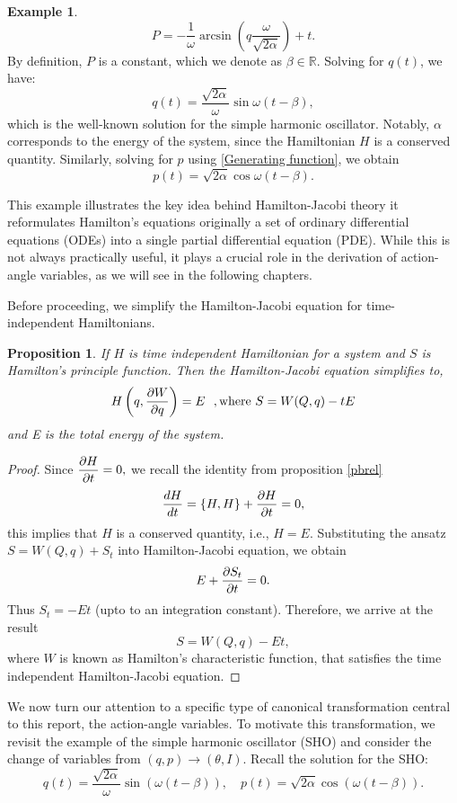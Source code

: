 \documentclass[12pt,oneside]{report}
\newtheorem{Proposition}[theorem]{Proposition}
\theoremstyle{definition}
\newtheorem{example}{Example}
\begin{document}
\begin{example}
\begin{equation}
P = -\frac{1}{\omega} \arcsin \left( q \frac{\omega}{\sqrt{2\alpha}} \right) + t.
\end{equation}
By definition, $P$ is a constant, which we denote as $\beta \in \mathbb{R}$. Solving for $q(t)$, we have:
\begin{equation}
q(t) = \frac{\sqrt{2\alpha}}{\omega} \sin \omega (t - \beta),
\end{equation}
which is the well-known solution for the simple harmonic oscillator. Notably, $\alpha$ corresponds to the energy of the system, since the Hamiltonian $H$ is a conserved quantity. Similarly, solving for $p$ using \autoref{Generating function}, we obtain
\begin{equation}
p(t) = \sqrt{2\alpha} \cos \omega (t - \beta).
\end{equation}
\end{example}
This example illustrates the key idea behind Hamilton-Jacobi theory it reformulates Hamilton’s equations originally a set of ordinary differential equations (ODEs) into a single partial differential equation (PDE). While this is not always practically useful, it plays a crucial role in the derivation of action-angle variables, as we will see in the following chapters.

Before proceeding, we simplify the Hamilton-Jacobi equation for time-independent Hamiltonians.
\begin{Proposition}\label{Time independent HJ}
    If $H$ is time independent Hamiltonian for a system and $S$ is Hamilton's principle function. Then the Hamilton-Jacobi equation simplifies to,
    $$H\left( q,\displaystyle\frac{\partial W}{\partial q}\right) = E \ \ ,\text{where} \ S = W(Q,q) -tE$$
    and E is the total energy of the system.
\end{Proposition}
\begin{proof}
    Since $\displaystyle\frac{\partial H}{\partial t} = 0 ,$ we recall the identity from proposition \ref{pbrel}
    $$ \displaystyle\frac{d H}{d t} = \displaystyle \left\{ H , H \right\} + \displaystyle\frac{\partial H}{\partial t } = 0,$$
    this implies that $H$ is a conserved quantity, i.e., $H = E$. Substituting the ansatz $S = W(Q,q)+S_{t}$ into Hamilton-Jacobi equation, we obtain
    $$ E+\displaystyle\frac{\partial S_{t}}{\partial t} = 0.$$
    Thus $S_{t} = -Et$  (upto to an integration constant). Therefore, we arrive at the result
    $$S = W(Q,q)-Et,$$
   where $W$ is known as Hamilton's characteristic function, that satisfies the time independent Hamilton-Jacobi equation.
\end{proof}

We now turn our attention to a specific type of canonical transformation central to this report, the action-angle variables. To motivate this transformation, we revisit the example of the simple harmonic oscillator (SHO) and consider the change of variables from $(q, p) \to (\theta, I)$. Recall the solution for the SHO:
$$q(t) = \frac{\sqrt{2\alpha}}{\omega} \sin(\omega(t - \beta)), \quad p(t) = \sqrt{2\alpha} \cos(\omega (t-\beta)). $$
\end{document}
